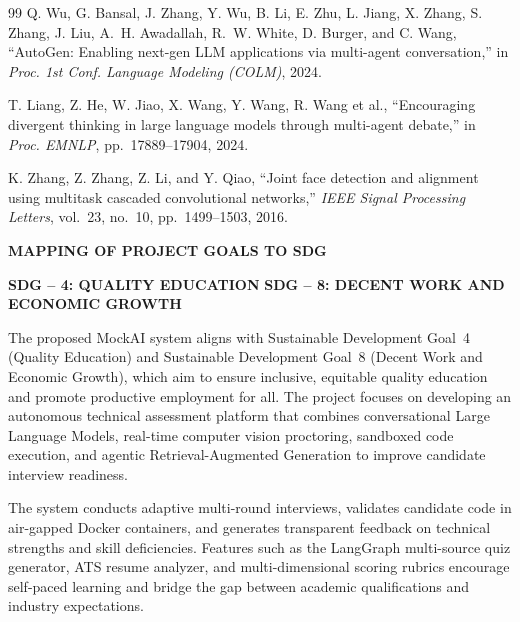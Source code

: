 \documentclass[12pt,a4paper]{report}
\begin{document}
\begin{thebibliography}{99}
Q. Wu, G. Bansal, J. Zhang, Y. Wu, B. Li, E. Zhu, L. Jiang, X. Zhang,
S. Zhang, J. Liu, A.~H. Awadallah, R.~W. White, D. Burger, and C. Wang,
``AutoGen: Enabling next-gen LLM applications via multi-agent conversation,''
in \textit{Proc. 1st Conf. Language Modeling (COLM)}, 2024.

T. Liang, Z. He, W. Jiao, X. Wang, Y. Wang, R. Wang et al.,
``Encouraging divergent thinking in large language models through multi-agent
debate,''
in \textit{Proc. EMNLP}, pp.~17889--17904, 2024.

K. Zhang, Z. Zhang, Z. Li, and Y. Qiao,
``Joint face detection and alignment using multitask cascaded convolutional
networks,''
\textit{IEEE Signal Processing Letters},
vol.~23, no.~10, pp.~1499--1503, 2016.

\end{thebibliography}

\clearpage
{}
\begin{center}
  {\large\bfseries MAPPING OF PROJECT GOALS TO SDG}
\end{center}

\vspace{0.5cm}
\noindent\textbf{SDG -- 4: QUALITY EDUCATION} \hfill
\textbf{SDG -- 8: DECENT WORK AND ECONOMIC GROWTH}

\vspace{0.5cm}
\noindent The proposed MockAI system aligns with Sustainable Development Goal~4
(Quality Education) and Sustainable Development Goal~8 (Decent Work and Economic
Growth), which aim to ensure inclusive, equitable quality education and promote
productive employment for all. The project focuses on developing an autonomous
technical assessment platform that combines conversational Large Language Models,
real-time computer vision proctoring, sandboxed code execution, and agentic
Retrieval-Augmented Generation to improve candidate interview readiness.

\vspace{0.4cm}
\noindent The system conducts adaptive multi-round interviews, validates candidate code in
air-gapped Docker containers, and generates transparent feedback on technical strengths
and skill deficiencies. Features such as the LangGraph multi-source quiz generator, ATS
resume analyzer, and multi-dimensional scoring rubrics encourage self-paced learning and
bridge the gap between academic qualifications and industry expectations.
\end{document}
